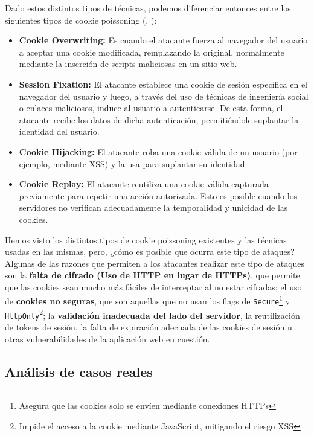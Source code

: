Dado estos distintos tipos de técnicas, podemos diferenciar entonces entre los siguientes tipos de cookie poissoning (\cite{appsecmonkey2024session}, \cite{ibm2024cookie}):

\begin{itemize}
    \item \textbf{Cookie Overwriting:} Es cuando el atacante fuerza al navegador del usuario a aceptar una cookie modificada, remplazando la original, normalmente mediante la inserción de scripts maliciosas en un sitio web.

    \item \textbf{Session Fixation:} El atacante establece una cookie de sesión específica en el navegador del usuario y luego, a través del uso de técnicas de ingeniería social o enlaces maliciosos, induce al usuario a autenticarse. De esta forma, el atacante recibe los datos de dicha autenticación, permitiéndole suplantar la identidad del usuario.

    \item \textbf{Cookie Hijacking:} El atacante roba una cookie válida de un usuario (por ejemplo, mediante XSS) y la usa para suplantar su identidad.

    \item \textbf{Cookie Replay:} El atacante reutiliza una cookie válida capturada previamente para repetir una acción autorizada. Esto es posible cuando los servidores no verifican adecuadamente la temporalidad y unicidad de las cookies.
\end{itemize}

Hemos visto los distintos tipos de cookie poissoning existentes y las técnicas usadas en las mismas, pero, ¿cómo es posible que ocurra este tipo de ataques? Algunas de las razones que permiten a los atacantes realizar este tipo de ataques son la \textbf{falta de cifrado (Uso de HTTP en lugar de HTTPs)}, que permite que las cookies sean mucho más fáciles de interceptar al no estar cifradas; el uso de \textbf{cookies no seguras}, que son aquellas que no usan los flags de \texttt{Secure}\footnote{Asegura que las cookies solo se envíen mediante conexiones HTTPs} y \texttt{HttpOnly}\footnote{Impide el acceso a la cookie mediante JavaScript, mitigando el riesgo XSS}; la \textbf{validación inadecuada del lado del servidor}, la reutilización de tokens de sesión, la falta de expiración adecuada de las cookies de sesión u otras vulnerabilidades de la aplicación web en cuestión.

\subsection{Análisis de casos reales}

